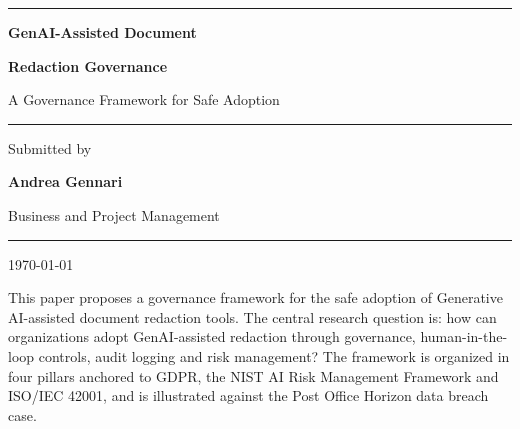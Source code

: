 \documentclass[12pt,a4paper]{article}
\begin{document}
\begin{titlepage}
    \centering
    \vspace*{3cm}

    {\color{accentdark}\rule{\textwidth}{1.5pt}}

    \vspace{1.2cm}
    {\Huge\bfseries\color{accentdark} GenAI-Assisted Document\par}
    \vspace{0.3cm}
    {\Huge\bfseries\color{accentdark} Redaction Governance\par}
    \vspace{0.8cm}
    {\Large\color{accentdark!80!black} A Governance Framework for Safe Adoption\par}
    \vspace{1.2cm}

    {\color{accentdark}\rule{0.4\textwidth}{0.8pt}}

    \vspace{2cm}
    {\large\color{accentdark!70!black} Submitted by\par}
    \vspace{0.3cm}
    {\LARGE\bfseries\color{accentdark} Andrea Gennari\par}
    \vspace{0.5cm}
    {\normalsize\color{accentdark!70!black} Business and Project Management\par}
    \vfill
    {\color{accentdark}\rule{\textwidth}{1.5pt}}
    \vspace{0.5cm}
    {\large\color{accentdark!70!black} \today\par}
\end{titlepage}

\thispagestyle{empty}
\vspace*{2cm}
\begin{tcolorbox}[
  enhanced, sharp corners,
  colback=white,
  colframe=accentdark,
  boxrule=0.5pt,
  coltitle=accentdark,
  colbacktitle=white,
  fonttitle=\bfseries\scshape,
  title=Abstract,
  titlerule=0.4pt,
  toptitle=2pt, bottomtitle=2pt,
  left=12pt, right=12pt, top=8pt, bottom=8pt,
]
This paper proposes a governance framework for the safe adoption of Generative AI-assisted document redaction tools. The central research question is: how can organizations adopt GenAI-assisted redaction through governance, human-in-the-loop controls, audit logging and risk management? The framework is organized in four pillars anchored to GDPR, the NIST AI Risk Management Framework and ISO/IEC 42001, and is illustrated against the Post Office Horizon data breach case.
\end{tcolorbox}
\end{document}
